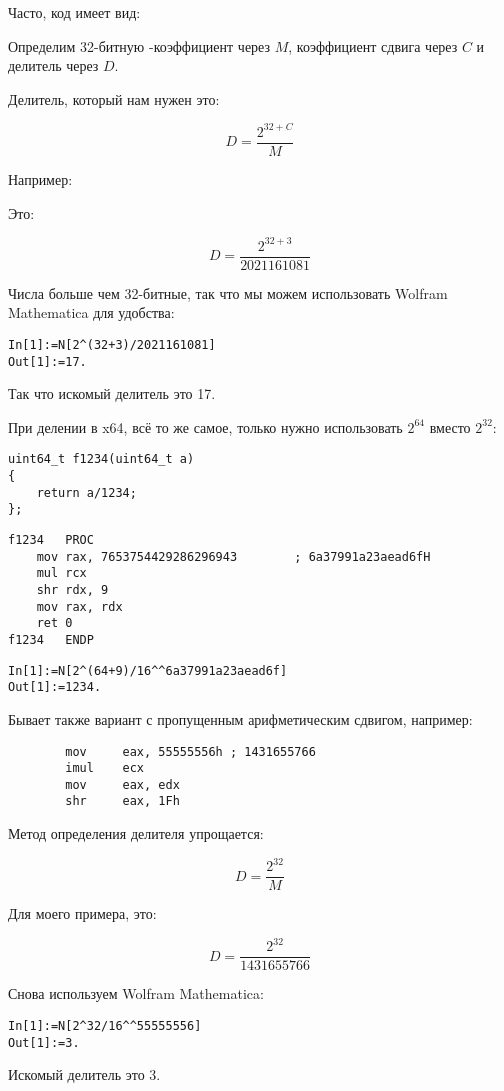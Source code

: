 ﻿


Часто, код имеет вид:



Определим 32-битную -коэффициент через $M$, коэффициент сдвига через $C$ и делитель через $D$.

Делитель, который нам нужен это:

\[
D=\frac{2^{32 + C}}{M}
\]

Например:



Это:

\[
D=\frac{2^{32 + 3}}{2021161081}
\]

Числа больше чем 32-битные, так что мы можем использовать Wolfram Mathematica для удобства:

\begin{lstlisting}[caption=Wolfram Mathematica]
In[1]:=N[2^(32+3)/2021161081]
Out[1]:=17.
\end{lstlisting}

Так что искомый делитель это 17.

При делении в x64, всё то же самое, только нужно использовать $2^{64}$ вместо $2^{32}$:

\begin{lstlisting}
uint64_t f1234(uint64_t a)
{
	return a/1234;
};
\end{lstlisting}

\begin{lstlisting}[caption=\Optimizing MSVC 2012 x64]
f1234	PROC
	mov	rax, 7653754429286296943		; 6a37991a23aead6fH
	mul	rcx
	shr	rdx, 9
	mov	rax, rdx
	ret	0
f1234	ENDP
\end{lstlisting}

\begin{lstlisting}[caption=Wolfram Mathematica]
In[1]:=N[2^(64+9)/16^^6a37991a23aead6f]
Out[1]:=1234.
\end{lstlisting}


Бывает также вариант с пропущенным арифметическим сдвигом, например:

\begin{lstlisting}
		mov     eax, 55555556h ; 1431655766
		imul    ecx
		mov     eax, edx
		shr     eax, 1Fh
\end{lstlisting}

Метод определения делителя упрощается:

\[
D=\frac{2^{32}}{M}
\]

Для моего примера, это:

\[
D=\frac{2^{32}}{1431655766}
\]

Снова используем Wolfram Mathematica:

\begin{lstlisting}[caption=Wolfram Mathematica]
In[1]:=N[2^32/16^^55555556]
Out[1]:=3.
\end{lstlisting}

Искомый делитель это 3.
